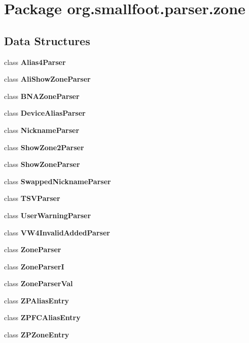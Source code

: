 \section{Package org.\+smallfoot.\+parser.\+zone}
\label{namespaceorg_1_1smallfoot_1_1parser_1_1zone}
\subsection*{Data Structures}
\begin{DoxyCompactItemize}
\item 
class {\bf Alias4\+Parser}
\item 
class {\bf Ali\+Show\+Zone\+Parser}
\item 
class {\bf B\+N\+A\+Zone\+Parser}
\item 
class {\bf Device\+Alias\+Parser}
\item 
class {\bf Nickname\+Parser}
\item 
class {\bf Show\+Zone2\+Parser}
\item 
class {\bf Show\+Zone\+Parser}
\item 
class {\bf Swapped\+Nickname\+Parser}
\item 
class {\bf T\+S\+V\+Parser}
\item 
class {\bf User\+Warning\+Parser}
\item 
class {\bf V\+W4\+Invalid\+Added\+Parser}
\item 
class {\bf Zone\+Parser}
\item 
class {\bf Zone\+Parser\+I}
\item 
class {\bf Zone\+Parser\+Val}
\item 
class {\bf Z\+P\+Alias\+Entry}
\item 
class {\bf Z\+P\+F\+C\+Alias\+Entry}
\item 
class {\bfseries Z\+P\+Zone\+Entry}
\end{DoxyCompactItemize}
